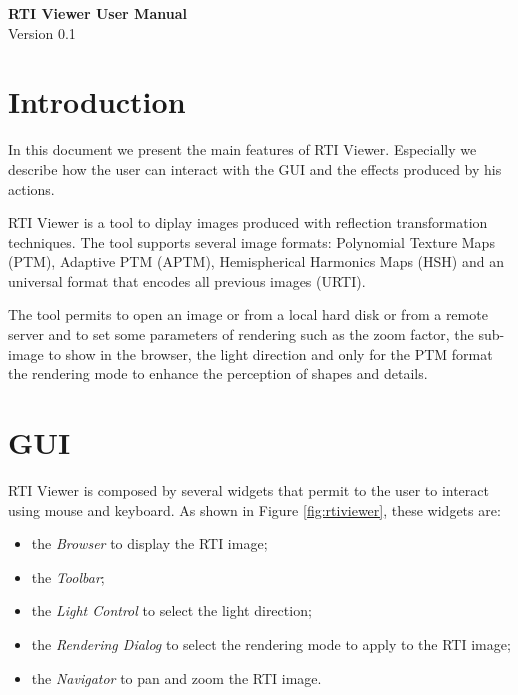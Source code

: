 \documentclass[oneside, 11pt]{book}
\begin{document}
\begin{titlepage}
\vspace*{0.5\textwidth}
\begin{center}
{\Huge \textbf{RTI Viewer User Manual}}
\\
\vspace{1.0cm}
Version 0.1
\end{center}

\end{titlepage}

\tableofcontents

\chapter{Introduction}
In this document we present the main features of RTI Viewer. Especially we describe how the user can interact with the GUI and the effects produced by his actions.

RTI Viewer is a tool to diplay images produced with reflection transformation techniques. The tool supports several image formats: Polynomial Texture Maps (PTM), Adaptive PTM (APTM), Hemispherical Harmonics Maps (HSH) and an universal format that encodes all previous images (URTI).

The tool permits to open an image or from a local hard disk or from a remote server and to set some parameters of rendering such as the zoom factor, the sub-image to show in the browser, the light direction and only for the PTM format the rendering mode to enhance the perception of shapes and details.

\chapter{GUI}
RTI Viewer is composed by several widgets that permit to the user to interact using mouse and keyboard. As shown in Figure \ref{fig:rtiviewer}, these widgets are:
\begin{itemize}
\item the \emph{Browser} to display the RTI image;
\item the \emph{Toolbar};
\item the \emph{Light Control} to select the light direction;
\item the \emph{Rendering Dialog} to select the rendering mode to apply to the RTI image;
\item the \emph{Navigator} to pan and zoom the RTI image.
\end{itemize}
\end{document}
